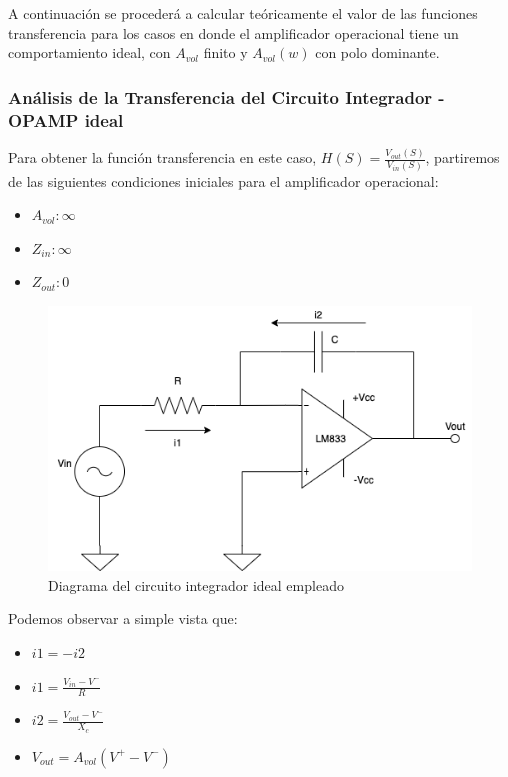 A continuación se procederá a calcular teóricamente el valor de las funciones transferencia para los casos en 
donde el amplificador operacional tiene un comportamiento ideal, con $A_{vol}$ finito y $A_{vol}(w)$ con polo dominante.

\subsubsection{Análisis de la Transferencia del Circuito Integrador - OPAMP ideal}

Para obtener la función transferencia en este caso, $H(S) = \frac{V_{out} (S)}{V_{in} (S)}$, partiremos de las siguientes condiciones
iniciales para el amplificador operacional:

\begin{itemize}
	\item $A_{vol}: \infty$
	\item $Z_{in}: \infty$
	\item $Z_{out}: 0$
\end{itemize}

\begin{figure}[H]
    \centering 
    \includegraphics [scale=0.5] {../Ejercicio3-CircuitoIntegradoresyDerivadores/Imagenes/diagrama-integrador-corrientes.png} 
    \caption{Diagrama del circuito integrador ideal empleado}
    \label{fig:emptyPlotTool}
\end{figure}

Podemos observar a simple vista que:

\begin{itemize}
	\item $i1 = -i2$
	\item $i1 = \frac {V_{in}-V^{-}}{R} $
	\item $i2 = \frac {V_{out}-V^{-}}{X_c}$
	\item $V_{out} = A_{vol}(V^{+}-V^{-})$
\end{itemize}

